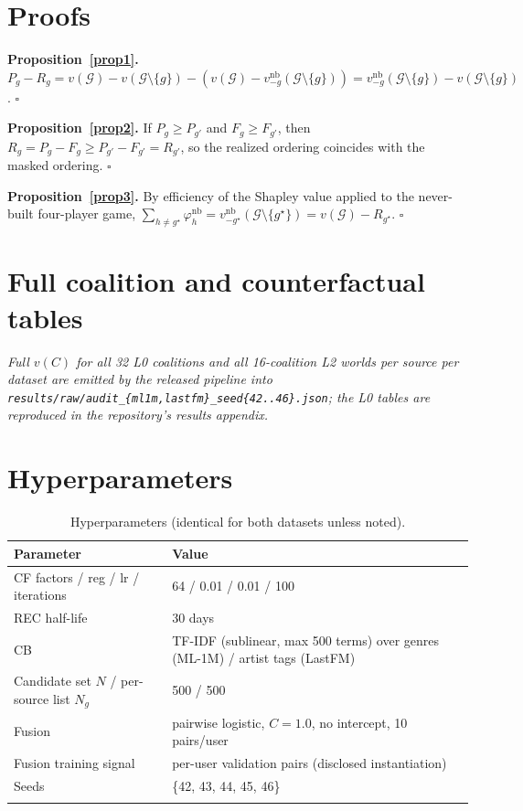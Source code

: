 \documentclass[pdflatex,sn-mathphys-num]{sn-jnl}
\theoremstyle{thmstyleone}%
\theoremstyle{thmstyletwo}%
\theoremstyle{thmstylethree}%
\newcommand{\Gset}{\mathcal{G}}
\newcommand{\reg}{R}
\newcommand{\pred}{P}
\begin{document}
\begin{appendices}

\section{Proofs}\label{secA1}

\textbf{Proposition~\ref{prop1}.} $\pred_g - \reg_g = v(\Gset)-v(\Gset\setminus\{g\}) - (v(\Gset) - v^{\mathrm{nb}}_{-g}(\Gset\setminus\{g\})) = v^{\mathrm{nb}}_{-g}(\Gset\setminus\{g\}) - v(\Gset\setminus\{g\})$. \hfill$\square$

\medskip
\textbf{Proposition~\ref{prop2}.} If $\pred_g \ge \pred_{g'}$ and $F_g \ge F_{g'}$, then $\reg_g = \pred_g - F_g \ge \pred_{g'} - F_{g'} = \reg_{g'}$, so the realized ordering coincides with the masked ordering. \hfill$\square$

\medskip
\textbf{Proposition~\ref{prop3}.} By efficiency of the Shapley value applied to the never-built four-player game, $\sum_{h\neq g^\star}\varphi_h^{\mathrm{nb}} = v^{\mathrm{nb}}_{-g^\star}(\Gset\setminus\{g^\star\}) = v(\Gset) - \reg_{g^\star}$. \hfill$\square$

\section{Full coalition and counterfactual tables}\label{secA2}

\emph{Full $v(C)$ for all 32 L0 coalitions and all 16-coalition L2 worlds per source per dataset are emitted by the released pipeline into \texttt{results/raw/audit\_\{ml1m,lastfm\}\_seed\{42..46\}.json}; the L0 tables are reproduced in the repository's results appendix.}

\section{Hyperparameters}\label{secA3}

\begin{table}[h]
\caption{Hyperparameters (identical for both datasets unless noted).}
\label{tab9}
\begin{tabular*}{\textwidth}{@{\extracolsep\fill}ll}
\toprule
Parameter & Value \\
\midrule
CF factors / reg / lr / iterations & 64 / 0.01 / 0.01 / 100 \\
REC half-life & 30 days \\
CB & TF-IDF (sublinear, max 500 terms) over genres (ML-1M) / artist tags (LastFM) \\
Candidate set $N$ / per-source list $N_g$ & 500 / 500 \\
Fusion & pairwise logistic, $C=1.0$, no intercept, 10 pairs/user \\
Fusion training signal & per-user validation pairs (disclosed instantiation) \\
Seeds & \{42, 43, 44, 45, 46\} \\
\botrule
\end{tabular*}
\end{table}


\end{appendices}
\end{document}
